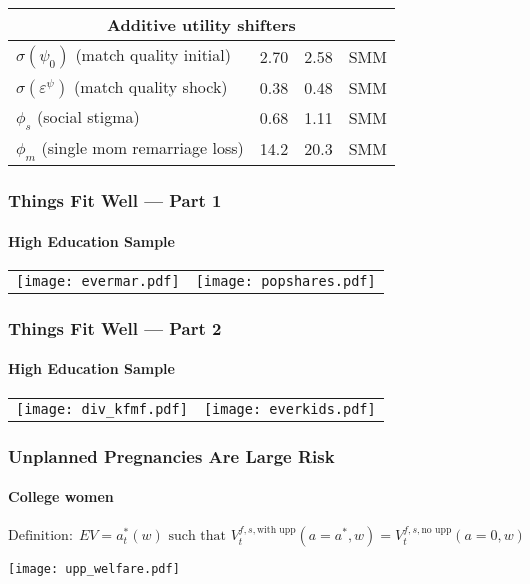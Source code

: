\documentclass[aspectratio=169]{beamer}
\begin{document}
\begin{frame}
\begin{tabular}{l c c c}
\multicolumn{4}{c}{Additive utility shifters}\\\hline
$\sigma(\psi_0)$  \footnotesize (match quality initial) & 2.70 & 2.58 & SMM \\
$\sigma(\varepsilon^\psi)$  \footnotesize (match quality shock) & 0.38 & 0.48 & SMM \\
$\phi_s$ \footnotesize  (social stigma) & 0.68 & 1.11 & SMM\\
$\phi_m$ \footnotesize   (single mom remarriage loss) & 14.2 & 20.3 & SMM \\\hline
\end{tabular}
\end{frame}



\begin{frame}
\frametitle{Things Fit Well --- Part 1}
\framesubtitle{High Education Sample}
\begin{center}

\begin{tabular}{c c}
\hspace{-1cm}\texttt{[image: evermar.pdf]} &\hspace{-0.5cm} \texttt{[image: popshares.pdf]} \\
\end{tabular}
\end{center}
\end{frame}


\begin{frame}
\frametitle{Things Fit Well --- Part 2}
\framesubtitle{High Education Sample}
\begin{center}
\begin{tabular}{c c}
\hspace{-1cm}\texttt{[image: div\_kfmf.pdf]}  & \hspace{-0.5cm} \texttt{[image: everkids.pdf]} 
\end{tabular}
\end{center}
\end{frame}

%
%

\begin{frame}
\frametitle{Unplanned Pregnancies Are Large Risk}
\framesubtitle{College women}
\[\text{Definition:} \ \  EV = a^*_t(w) \text{ such that } V_{t}^{f,s,\text{with upp}}(a=a^*,w) = V_{t}^{f,s,\text{no upp}}(a=0,w)\]
\begin{center}
\texttt{[image: upp\_welfare.pdf]} 
\end{center}
\end{frame}
\end{document}
